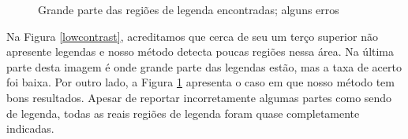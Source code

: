 \documentclass[12pt]{article}
\begin{document}
\begin{figure}[h!]
  \centering
  \quad
  \caption{Grande parte das regiões de legenda encontradas; alguns
    erros\label{highcontrast}}
\end{figure}

Na  Figura \ref{lowcontrast}, acreditamos  que cerca  de seu  um terço
superior não apresente legendas  e nosso método detecta poucas regiões
nessa  área.  %
Na última parte  desta imagem é onde grande  parte das legendas estão,
mas  a  taxa   de  acerto  foi  baixa.   Por   outro  lado,  a  Figura
\ref{highcontrast}  apresenta o  caso  em que  nosso  método tem  bons
resultados.   Apesar de  reportar incorretamente  algumas  partes como
sendo  de legenda,  todas  as  reais regiões  de  legenda foram  quase
completamente indicadas.
\end{document}
